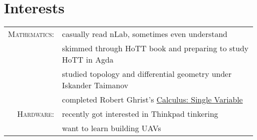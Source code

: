 \documentclass[a4paper,11pt]{article}
\begin{document}
  \section{Interests}
    \begin{tabular}{rl}
      \textsc{Mathematics:} & casually read nLab, sometimes even understand                      \\
                            & skimmed through HoTT book and preparing to study HoTT in Agda      \\
                            & studied topology and differential geometry under Iskander Taimanov \\
                            & completed Robert Ghrist's
                              \href{https://www.coursera.org/account/accomplishments/records/9Y3N9X2BMR}{Calculus:
                              Single Variable} \\
      \textsc{Hardware:} & recently got interested in Thinkpad tinkering \\
                         & want to learn building UAVs                   \\
    \end{tabular}
\end{document}
